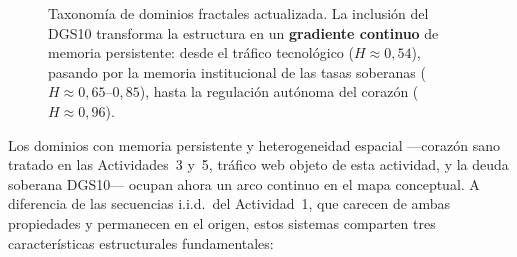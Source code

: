 \begin{figure}[H]
\caption{Taxonomía de dominios fractales actualizada. La inclusión del DGS10
         transforma la estructura en un \textbf{gradiente continuo} de memoria
         persistente: desde el tráfico tecnológico ($H\approx0{,}54$), pasando
         por la memoria institucional de las tasas soberanas
         ($H\approx0{,}65$--$0{,}85$), hasta la regulación autónoma del corazón
         ($H\approx0{,}96$).}
\label{fig:taxonomia}
\end{figure}

Los dominios con memoria persistente y heterogeneidad espacial ---corazón sano
tratado en las Actividades~3 y~5, tráfico web objeto de esta actividad, y la
deuda soberana DGS10--- ocupan ahora un arco continuo en el mapa conceptual. A
diferencia de las secuencias i.i.d.\ del Actividad~1, que carecen de ambas
propiedades y permanecen en el origen, estos sistemas comparten tres
características estructurales fundamentales:

